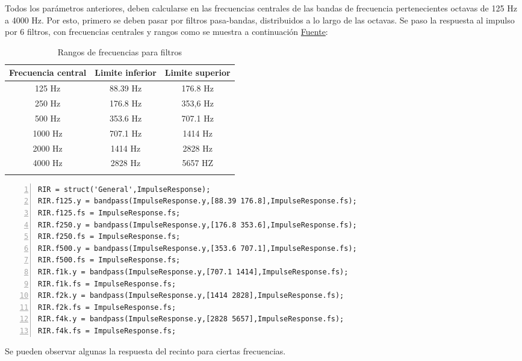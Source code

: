 Todos los parámetros anteriores, deben calcularse en las frecuencias centrales de las bandas de frecuencia pertenecientes octavas de 125 Hz a 4000 Hz. Por esto, primero se deben pasar por filtros pasa-bandas, distribuidos a lo largo de las octavas.
Se paso la respuesta al impulso por 6 filtros, con frecuencias centrales y rangos como se muestra a continuación \href{https://www.doctorproaudio.com/content.php?2402-octaves-and-third-octaves#:~:text=As%20a%20reference%2C%20the%20central,exactly%20to%20double%20or%20half.}{Fuente}:
\begin{center}
    \begin{longtable}[!htb]{ |c|c|c| }
    \hline
    Frecuencia central & Limite inferior & Limite superior \\
    \hline
    125 Hz & 88.39 Hz & 176.8 Hz \\
    250 Hz & 176.8 Hz & 353,6 Hz \\
    500 Hz & 353.6 Hz & 707.1 Hz \\
    1000 Hz & 707.1 Hz & 1414 Hz \\
    2000 Hz & 1414 Hz & 2828 Hz \\
    4000 Hz & 2828 Hz & 5657 HZ \\
    \hline
    \caption{Rangos de frecuencias para filtros}
    \label{tab:Rangos De Frecuencias}
    \end{longtable} 
\end{center}
\begin{lstlisting}[frame=single,numbers=left, style=Matlab-editor, basicstyle=\tiny]
RIR = struct('General',ImpulseResponse); 
RIR.f125.y = bandpass(ImpulseResponse.y,[88.39 176.8],ImpulseResponse.fs);
RIR.f125.fs = ImpulseResponse.fs;
RIR.f250.y = bandpass(ImpulseResponse.y,[176.8 353.6],ImpulseResponse.fs);
RIR.f250.fs = ImpulseResponse.fs;
RIR.f500.y = bandpass(ImpulseResponse.y,[353.6 707.1],ImpulseResponse.fs);
RIR.f500.fs = ImpulseResponse.fs;
RIR.f1k.y = bandpass(ImpulseResponse.y,[707.1 1414],ImpulseResponse.fs);
RIR.f1k.fs = ImpulseResponse.fs;
RIR.f2k.y = bandpass(ImpulseResponse.y,[1414 2828],ImpulseResponse.fs);
RIR.f2k.fs = ImpulseResponse.fs;
RIR.f4k.y = bandpass(ImpulseResponse.y,[2828 5657],ImpulseResponse.fs);
RIR.f4k.fs = ImpulseResponse.fs;
\end{lstlisting}
Se pueden observar algunas la respuesta del recinto para ciertas frecuencias.
